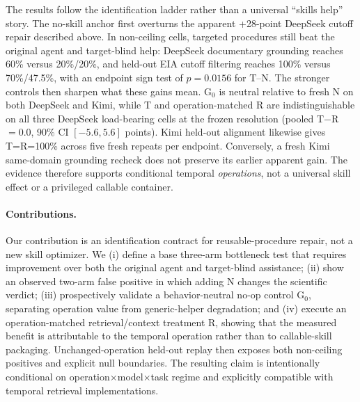 The results follow the identification ladder rather than a universal ``skills help'' story. The no-skill anchor first overturns the apparent +28-point DeepSeek cutoff repair described above. In non-ceiling cells, targeted procedures still beat the original agent and target-blind help: DeepSeek documentary grounding reaches 60\% versus 20\%/20\%, and held-out EIA cutoff filtering reaches 100\% versus 70\%/47.5\%, with an endpoint sign test of $p=0.0156$ for T--N. The stronger controls then sharpen what these gains mean. G$_0$ is neutral relative to fresh N on both DeepSeek and Kimi, while T and operation-matched R are indistinguishable on all three DeepSeek load-bearing cells at the frozen resolution (pooled T$-$R $=0.0$, 90\% CI $[-5.6,5.6]$ points). Kimi held-out alignment likewise gives T=R=100\% across five fresh repeats per endpoint. Conversely, a fresh Kimi same-domain grounding recheck does not preserve its earlier apparent gain. The evidence therefore supports conditional temporal \emph{operations}, not a universal skill effect or a privileged callable container.

\paragraph{Contributions.}
Our contribution is an identification contract for reusable-procedure repair, not a new skill optimizer. We (i) define a base three-arm bottleneck test that requires improvement over both the original agent and target-blind assistance; (ii) show an observed two-arm false positive in which adding N changes the scientific verdict; (iii) prospectively validate a behavior-neutral no-op control G$_0$, separating operation value from generic-helper degradation; and (iv) execute an operation-matched retrieval/context treatment R, showing that the measured benefit is attributable to the temporal operation rather than to callable-skill packaging. Unchanged-operation held-out replay then exposes both non-ceiling positives and explicit null boundaries. The resulting claim is intentionally conditional on operation$\times$model$\times$task regime and explicitly compatible with temporal retrieval implementations.
